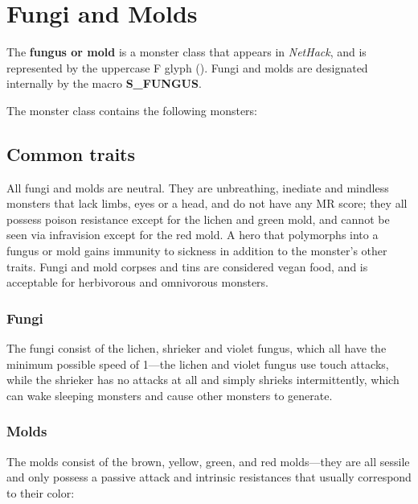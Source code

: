 \chapter{Fungi and Molds}
The \textbf{fungus or mold} is a monster class that appears in \textit{NetHack}, and is represented by the uppercase F glyph (\whitesym[F]). Fungi and molds are designated internally by the macro \textbf{S\_FUNGUS}.

The monster class contains the following monsters:

\begin{myitemize}
\item{}\monsymlink[lichen]
\item{}
\item{}
\item{}
\item{}
\item{}\monsymlink[shrieker]
\item{}
\end{myitemize}

\section{Common traits}
All fungi and molds are neutral. They are unbreathing, inediate and mindless monsters that lack limbs, eyes or a head, and do not have any MR score; they all possess poison resistance except for the lichen and green mold, and cannot be seen via infravision except for the red mold. A hero that polymorphs into a fungus or mold gains immunity to sickness in addition to the monster's other traits. Fungi and mold corpses and tins are considered vegan food, and is acceptable for herbivorous and omnivorous monsters.

\subsection{Fungi}
The fungi consist of the lichen, shrieker and violet fungus, which all have the minimum possible speed of 1{\mbox{$\text{---}$}}the lichen and violet fungus use touch attacks, while the shrieker has no attacks at all and simply shrieks intermittently, which can wake sleeping monsters and cause other monsters to generate.

\subsection{Molds}
The molds consist of the brown, yellow, green, and red molds{\mbox{$\text{---}$}}they are all sessile and only possess a passive attack and intrinsic resistances that usually correspond to their color:

